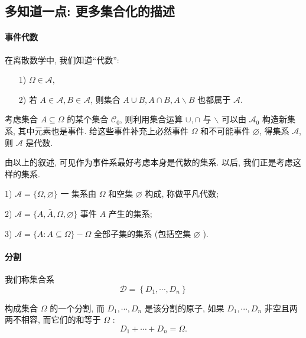 
\subsection*{多知道一点: 更多集合化的描述}

\paragraph{事件代数}

在离散数学中, 我们知道``代数'':
\begin{itemize}
    \item [1)] $\Omega \in \mathscr{A}$,
    \item    [2)] 若 $A \in \mathscr{A}, B \in \mathscr{A}$, 则集合 $A \cup B, A \cap B, A \backslash B$ 也都属于 $\mathscr{A}$.
    
\end{itemize}
考虑集合 $A \subseteq \Omega$ 的某个集合 $\mathscr{C}_0$, 则利用集合运算 $\cup, \cap$ 与 $\backslash$ 可以由 $\mathscr{A}_0$ 构造新集系, 其中元素也是事件. 给这些事件补充上必然事件 $\Omega$ 和不可能事件 $\varnothing$, 得集系 $\mathscr{A}$, 则 $\mathscr{A}$ 是代数. 

由以上的叙述, 可见作为事件系最好考虑本身是代数的集系. 以后, 我们正是考虑这样的集系.

\begin{example}
    1) $\mathscr{A}=\{\Omega, \varnothing\}$ 一 集系由 $\Omega$ 和空集 $\varnothing$ 构成, 称做平凡代数; 
    
    2) $\mathscr{A}=\{A, \bar{A}, \Omega, \varnothing\}$ 事件 $A$ 产生的集系;

    3) $\mathscr{A}=\{A: A \subseteq \Omega\}-\Omega$ 全部子集的集系 (包括空集 $\varnothing$ ).
\end{example}

\paragraph{分割} 我们称集合系
$$
\mathscr{D}=\left\{D_1, \cdots, D_n\right\}
$$

构成集合 $\Omega$ 的一个分割, 而 $D_1, \cdots, D_n$ 是该分割的原子, 如果 $D_1, \cdots, D_n$ 非空且两两不相容, 而它们的和等于 $\Omega$ :
$$
D_1+\cdots+D_n=\Omega .
$$
